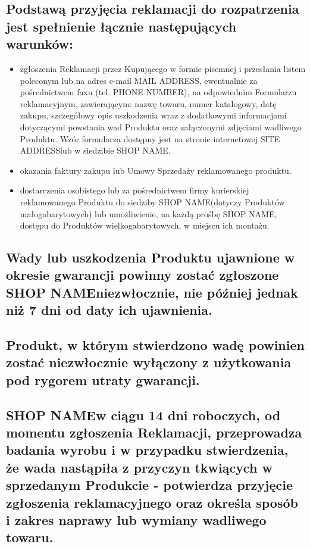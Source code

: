 \documentclass[10pt,a4paper]{article}
\newcommand{\shopname}{SHOP NAME}
\newcommand{\httpaddr}{SITE ADDRESS}
\newcommand{\mail}{MAIL ADDRESS}
\newcommand{\phone}{PHONE NUMBER}
\begin{document}
\subsection{Podstawą przyjęcia reklamacji do rozpatrzenia jest spełnienie łącznie następujących warunków:}

\begin{itemize}

\item zgłoszenia Reklamacji przez Kupującego w formie pisemnej i przesłania listem poleconym lub na adres e-mail
\mail, ewentualnie za pośrednictwem faxu (tel. \phone), na odpowiednim Formularzu reklamacyjnym,
zawierającym: nazwę towaru, numer katalogowy, datę zakupu, szczegółowy opis uszkodzenia wraz z dodatkowymi informacjami
dotyczącymi powstania wad Produktu oraz załączonymi zdjęciami wadliwego Produktu. Wzór formularza dostępny jest na stronie
internetowej \httpaddr lub w siedzibie \shopname.

\item okazania faktury zakupu lub Umowy Sprzedaży reklamowanego produktu.

\item dostarczenia osobistego lub za pośrednictwem firmy kurierskiej reklamowanego Produktu do siedziby \shopname (dotyczy Produktów
małogabarytowych) lub umożliwienie, na każdą prośbę \shopname, dostępu do Produktów wielkogabarytowych, w miejscu ich
montażu.

\end{itemize}

\subsection{Wady lub uszkodzenia Produktu ujawnione w okresie gwarancji powinny zostać zgłoszone \shopname niezwłocznie, nie później
jednak niż 7 dni od daty ich ujawnienia.}

\subsection{Produkt, w którym stwierdzono wadę powinien zostać niezwłocznie wyłączony z użytkowania pod rygorem utraty gwarancji.}

\subsection{\shopname w ciągu 14 dni roboczych, od momentu zgłoszenia Reklamacji, przeprowadza badania wyrobu i w przypadku stwierdzenia, że
wada nastąpiła z przyczyn tkwiących w sprzedanym Produkcie - potwierdza przyjęcie zgłoszenia reklamacyjnego oraz określa sposób i
zakres naprawy lub wymiany wadliwego towaru.}
\end{document}
